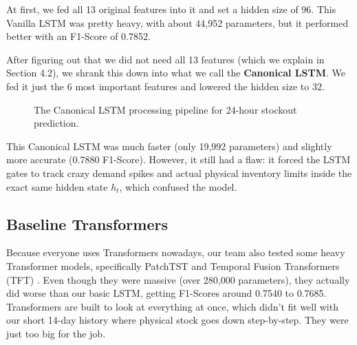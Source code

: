 At first, we fed all 13 original features into it and set a hidden size of 96. This Vanilla LSTM was pretty heavy, with about 44,952 parameters, but it performed better with an F1-Score of 0.7852.

After figuring out that we did not need all 13 features (which we explain in Section 4.2), we shrank this down into what we call the \textbf{Canonical LSTM}. We fed it just the 6 most important features and lowered the hidden size to 32. 

\begin{figure}[!htbp]
    \centering
    \caption{The Canonical LSTM processing pipeline for 24-hour stockout prediction.}
    \label{fig:canonical_lstm}
\end{figure}

This Canonical LSTM was much faster (only 19,992 parameters) and slightly more accurate (0.7880 F1-Score). However, it still had a flaw: it forced the LSTM gates to track crazy demand spikes and actual physical inventory limits inside the exact same hidden state $h_t$, which confused the model.

\subsection{Baseline Transformers}
Because everyone uses Transformers nowadays, our team also tested some heavy Transformer models, specifically PatchTST \cite{nie2023patchtst} and Temporal Fusion Transformers (TFT) \cite{lim2021tft}. Even though they were massive (over 280,000 parameters), they actually did worse than our basic LSTM, getting F1-Scores around 0.7540 to 0.7685. Transformers are built to look at everything at once, which didn't fit well with our short 14-day history where physical stock goes down step-by-step. They were just too big for the job.

